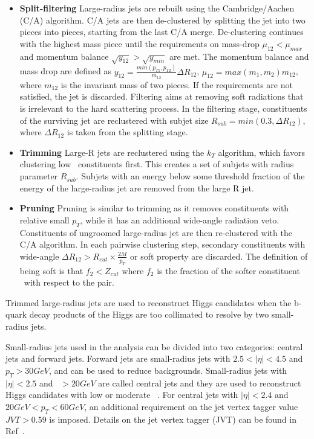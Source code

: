 \begin{itemize}
    \item \textbf{Split-filtering} Large-radius jets are rebuilt using the Cambridge/Aachen (C/A) algorithm. C/A jets are then de-clustered by splitting the jet into two pieces into pieces, starting from the last C/A merge. De-clustering continues with the highest mass piece 
    until the requirements on mass-drop $\mu_{12} < \mu_{max}$ and momentum balance $\sqrt{y_{12}} > \sqrt{y_{min}}$ are met. The momentum balance and mass drop are defined as $y_{12} = \frac{min(p_{T1},p_{T2})}{m_{12}}\Delta R_{12} $, $\mu_{12} = max(m_1,m_2) m_{12}$, where $m_{12}$ 
    is the invariant mass of two pieces. If the requirements are not satisfied, the jet is discarded. Filtering aims at removing soft radiations that is irrelevant to the hard scattering process. 
    In the filtering stage, constituents of the surviving jet are reclustered with subjet size $R_{sub} = min(0.3,\Delta R_{12})$, where $\Delta R_{12}$ is taken from the splitting stage.
    \item \textbf{Trimming} Large-R jets are reclustered using the $k_T$ algorithm, 
    which favors clustering low \pt~constituents first. This creates a set of subjets with radius parameter $R_{sub}$. 
    Subjets with an energy below some threshold fraction of the energy of the large-radius jet are removed from the large R jet.
    \item \textbf{Pruning} Pruning is similar to trimming as it removes constituents with relative small $p_T$, while it has an additional wide-angle radiation veto. 
    Constituents of ungroomed large-radius jet are then re-clustered with the C/A algorithm. In each pairwise clustering step, secondary constituents with wide-angle 
    $\Delta R_{12} > R_{cut} \times \frac{2M}{p_T}$ or soft property are discarded. The definition of being soft is that $f_2 < Z_{cut}$ where $f_2$ is the fraction of the softer constituent \pt~with respect to the pair.
\end{itemize}

\par Trimmed large-radius jets are used to reconstruct Higgs candidates when the b-quark decay products of the Higgs are too collimated to resolve by two small-radius jets.

\par Small-radius jets used in the analysis can be divided into two categories: central jets and forward jets. Forward jets are small-radius jets with $2.5 < |\eta| < 4.5$ and $p_T > 30 GeV$, and can be used to reduce backgrounds. 
Small-radius jets with $|\eta| < 2.5$ and \pt~$> 20 GeV$ are called central jets and they are used to reconstruct Higgs candidates with low or moderate \pt~.
For central jets with $|\eta| < 2.4$ and $20 GeV < p_T < 60 GeV$, an additional requirement on the jet vertex tagger value $JVT > 0.59$ is imposed. Details on the jet vertex tagger (JVT) can be found in Ref~\cite{Aad:2015ina}.


